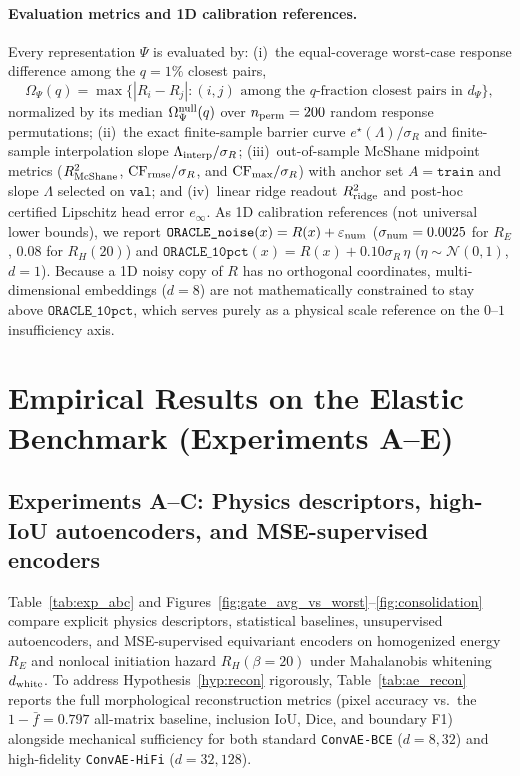 \documentclass[preprint,11pt,a4paper]{elsarticle}
\begin{document}
\paragraph{Evaluation metrics and 1D calibration references.}
Every representation $\Psi$ is evaluated by:
(i)~the equal-coverage worst-case response difference among the $q=1\%$ closest pairs,
\begin{equation}
\Omega_\Psi(q) = \max\big\{|R_i-R_j| : (i,j)\text{ among the }q\text{-fraction closest pairs in }d_\Psi\big\},
\end{equation}
normalized by its median $\Omega_\Psi^{\rm null}(q)$ over $n_{\rm perm}=200$ random response permutations;
(ii)~the exact finite-sample barrier curve $e^\star(\Lambda)/\sigma_R$ and finite-sample interpolation slope $\Lambda_{\rm interp}/\sigma_R$;
(iii)~out-of-sample McShane midpoint metrics ($R^2_{\rm McShane}$, ${\rm CF}_{\rm rmse}/\sigma_R$, and ${\rm CF}_{\max}/\sigma_R$) with anchor set $A=\texttt{train}$ and slope $\Lambda$ selected on $\texttt{val}$; and
(iv)~linear ridge readout $R^2_{\rm ridge}$ and post-hoc certified Lipschitz head error $e_\infty$.
As 1D calibration references (not universal lower bounds), we report $\texttt{ORACLE\_noise}(x)=R(x)+\varepsilon_{\rm num}$ ($\sigma_{\rm num}=0.0025$ for $R_E$, $0.08$ for $R_H(20)$) and $\texttt{ORACLE\_10pct}(x)=R(x)+0.10\sigma_R\,\eta$ ($\eta\sim\mathcal N(0,1)$, $d=1$). Because a 1D noisy copy of $R$ has no orthogonal coordinates, multi-dimensional embeddings ($d=8$) are not mathematically constrained to stay above $\texttt{ORACLE\_10pct}$, which serves purely as a physical scale reference on the $0\text{--}1$ insufficiency axis.

\section{Empirical Results on the Elastic Benchmark (Experiments A--E)}
\label{sec:results_elastic}

\subsection{Experiments A--C: Physics descriptors, high-IoU autoencoders, and MSE-supervised encoders}
\label{sec:exp_abc}

Table~\ref{tab:exp_abc} and Figures~\ref{fig:gate_avg_vs_worst}--\ref{fig:consolidation} compare explicit physics descriptors, statistical baselines, unsupervised autoencoders, and MSE-supervised equivariant encoders on homogenized energy $R_E$ and nonlocal initiation hazard $R_H(\beta=20)$ under Mahalanobis whitening $d_{\rm white}$. To address Hypothesis~\ref{hyp:recon} rigorously, Table~\ref{tab:ae_recon} reports the full morphological reconstruction metrics (pixel accuracy vs.\ the $1-\bar f=0.797$ all-matrix baseline, inclusion IoU, Dice, and boundary F1) alongside mechanical sufficiency for both standard \texttt{ConvAE-BCE} ($d=8,32$) and high-fidelity \texttt{ConvAE-HiFi} ($d=32,128$).
\end{document}
